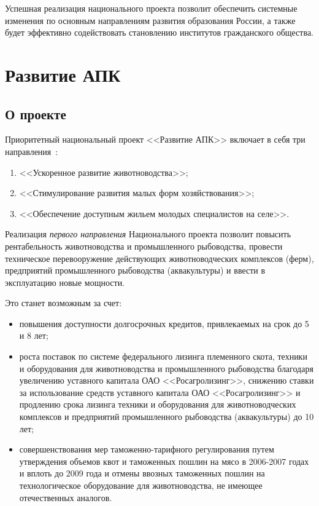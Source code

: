 \documentclass[article, 12pt, russian, oneside]{ncc}
\begin{document}
Успешная реализация национального проекта позволит обеспечить
системные изменения по основным направлениям развития образования
России, а также будет эффективно содействовать становлению институтов
гражданского общества.
\newpage

\section{Развитие АПК}

\subsection{О проекте}

Приоритетный национальный проект <<Развитие АПК>> включает в себя три
направления~\cite{APK_Problems}:

\begin{enumerate}
\item <<Ускоренное развитие животноводства>>;
\item <<Стимулирование развития малых форм хозяйствования>>;
\item <<Обеспечение доступным жильем молодых специалистов на селе>>.
\end{enumerate}

Реализация \emph{первого направления} Национального проекта позволит
повысить рентабельность животноводства и промышленного рыбоводства,
провести техническое перевооружение действующих животноводческих
комплексов (ферм), предприятий промышленного рыбоводства
(аквакультуры) и ввести в эксплуатацию новые мощности.

Это станет возможным за счет:

\begin{itemize}
\item повышения доступности долгосрочных кредитов, привлекаемых на
  срок до 5 и 8 лет;
\item роста поставок по системе федерального лизинга племенного скота,
  техники и оборудования для животноводства и промышленного
  рыбоводства благодаря увеличению уставного капитала ОАО
  <<Росагролизинг>>, снижению ставки за использование средств
  уставного капитала ОАО <<Росагролизинг>> и продлению срока лизинга
  техники и оборудования для животноводческих комплексов и предприятий
  промышленного рыбоводства (аквакультуры) до 10 лет;
\item совершенствования мер таможенно-тарифного регулирования путем
  утверждения объемов квот и таможенных пошлин на мясо в 2006-2007
  годах и вплоть до 2009 года и отмены ввозных таможенных пошлин на
  технологическое оборудование для животноводства, не имеющее
  отечественных аналогов.
\end{itemize}
\end{document}
